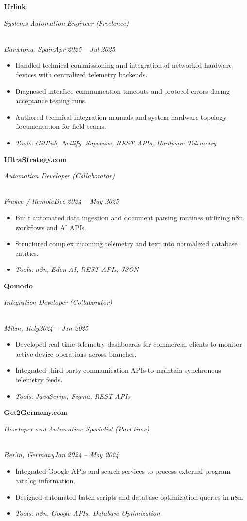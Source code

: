 \documentclass[a4paper,10pt]{article}
\newcommand{\role}[4]{\vspace{3pt}\noindent\hspace{0.6em}\parbox[t]{0.38\textwidth}{\raggedright\textbf{#1}}\hfill\parbox[t]{0.58\textwidth}{\raggedleft\textit{#2}}\\{\textit{#3}\hfill\textit{#4}}\vspace{1pt}}
\begin{document}
\role{Urlink}{Systems Automation Engineer (Freelance)}{Barcelona, Spain}{Apr 2025 -- Jul 2025}
\begin{itemize}
\item Handled technical commissioning and integration of networked hardware devices with centralized telemetry backends.
\item Diagnosed interface communication timeouts and protocol errors during acceptance testing runs.
\item Authored technical integration manuals and system hardware topology documentation for field teams.
\item \textit{Tools: GitHub, Netlify, Supabase, REST APIs, Hardware Telemetry}
\end{itemize}

\role{UltraStrategy.com}{Automation Developer (Collaborator)}{France / Remote}{Dec 2024 -- May 2025}
\begin{itemize}
\item Built automated data ingestion and document parsing routines utilizing n8n workflows and AI APIs.
\item Structured complex incoming telemetry and text into normalized database entities.
\item \textit{Tools: n8n, Eden AI, REST APIs, JSON}
\end{itemize}

\role{Qomodo}{Integration Developer (Collaborator)}{Milan, Italy}{2024 -- Jan 2025}
\begin{itemize}
\item Developed real-time telemetry dashboards for commercial clients to monitor active device operations across branches.
\item Integrated third-party communication APIs to maintain synchronous telemetry feeds.
\item \textit{Tools: JavaScript, Figma, REST APIs}
\end{itemize}

\role{Get2Germany.com}{Developer and Automation Specialist (Part time)}{Berlin, Germany}{Jan 2024 -- May 2024}
\begin{itemize}
\item Integrated Google APIs and search services to process external program catalog information.
\item Designed automated batch scripts and database optimization queries in n8n.
\item \textit{Tools: n8n, Google APIs, Database Optimization}
\end{itemize}
\end{document}
